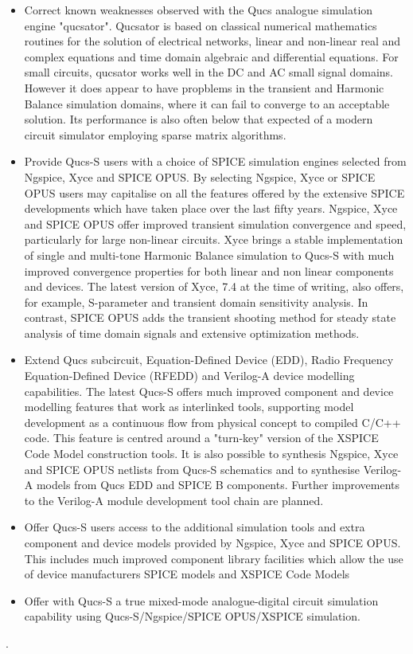 \begin{itemize}
	\item { Correct known weaknesses observed with the Qucs analogue simulation engine "qucsator". Qucsator is based on classical numerical mathematics routines for the solution of electrical networks, linear and non-linear real and complex equations and time domain algebraic and differential equations. For small circuits, qucsator works well in the DC and AC small signal domains. However it does appear to have propblems in the transient and Harmonic Balance simulation domains, where it can fail to converge to an acceptable solution.  Its performance is also often below that expected of a modern circuit simulator employing sparse matrix algorithms. }
	\item { Provide Qucs-S users with a choice of SPICE simulation engines selected from Ngspice, Xyce and SPICE OPUS. By selecting Ngspice, Xyce or SPICE OPUS users may capitalise on all the features offered by the extensive SPICE developments which have taken place over the last fifty years.  Ngspice, Xyce and SPICE OPUS offer improved transient simulation convergence and speed, particularly for large non-linear circuits. Xyce brings a stable implementation of single and multi-tone Harmonic Balance simulation to Qucs-S with much improved convergence properties for both linear and non linear components and devices. The latest version of Xyce, 7.4 at the time of writing, also offers, for example, S-parameter and transient domain sensitivity analysis. In contrast, SPICE OPUS adds the transient shooting method for steady state analysis of time domain signals and extensive optimization methods. }
	\item {Extend Qucs subcircuit, Equation-Defined Device (EDD), Radio Frequency Equation-Defined Device (RFEDD) and Verilog-A device modelling capabilities. The latest Qucs-S offers much improved component and device modelling features that work as interlinked tools, supporting model development as a continuous flow from physical concept to compiled C/C++ code.  This feature is centred around a "turn-key" version of the XSPICE Code Model construction tools. It is also possible to synthesis Ngspice, Xyce and SPICE OPUS netlists from Qucs-S schematics and to synthesise Verilog-A models from Qucs EDD and SPICE B components. Further improvements to the Verilog-A module development tool chain are planned.}
	\item {Offer Qucs-S users access to the additional simulation tools and extra component and device models provided by Ngspice, Xyce and SPICE OPUS. This includes much improved component library facilities which allow the use of device manufacturers SPICE models and XSPICE Code Models}
	\item {Offer with Qucs-S a true mixed-mode analogue-digital circuit simulation capability using Qucs-S/Ngspice/SPICE OPUS/XSPICE simulation.}
\end{itemize}
.
\newline

